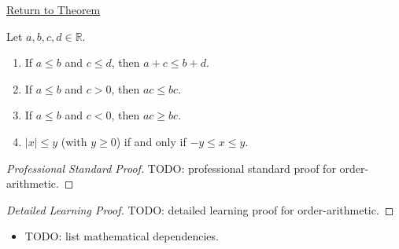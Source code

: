 \newpage
{}
\label{prf:order-arithmetic}

\begin{remark*}[Return]
\hyperref[prop:order-arithmetic]{Return to Theorem}
\end{remark*}

\begin{proposition*}
Let $a,b,c,d\in\mathbb{R}$.
\begin{enumerate}[label=(\roman*)]
  \item If $a\leq b$ and $c\leq d$, then $a+c\leq b+d$.
  \item If $a\leq b$ and $c>0$, then $ac\leq bc$.
  \item If $a\leq b$ and $c<0$, then $ac\geq bc$.
  \item $|x|\leq y$ (with $y\geq 0$) if and only if $-y\leq x\leq y$.
\end{enumerate}
\end{proposition*}

\begin{proof}[Professional Standard Proof]
\LRAProofBodyStart
TODO: professional standard proof for order-arithmetic.
\end{proof}

\begin{proof}[Detailed Learning Proof]
\LRAProofBodyStart
TODO: detailed learning proof for order-arithmetic.
\end{proof}

\begin{remark*}
\end{remark*}

\begin{dependencies}
\begin{itemize}
  \item TODO: list mathematical dependencies.
\end{itemize}
\end{dependencies}

\clearpage
